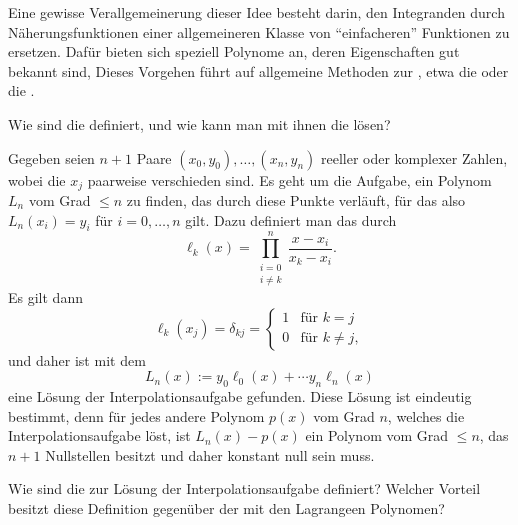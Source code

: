   Eine gewisse Verallgemeinerung 
  dieser Idee besteht darin, den Integranden durch 
  Näherungsfunktionen einer allgemeineren Klasse von 
  "`einfacheren"' Funktionen zu ersetzen. Dafür bieten sich speziell 
  Polynome an, deren Eigenschaften gut bekannt sind, 
  Dieses Vorgehen 
  führt auf allgemeine Methoden zur , 
  etwa die  oder die 
  .  

  \begin{frage}
    Wie sind die  definiert, und wie 
    kann man mit ihnen die   
    lösen?
  \end{frage} 

  \begin{antwort}
    Gegeben seien $n+1$ Paare $(x_0,y_0),\ldots, (x_n,y_n)$ 
    reeller oder komplexer Zahlen, wobei die $x_j$ paarweise verschieden sind. 
    Es geht um die Aufgabe, ein Polynom $L_n$ 
    vom Grad $\le n$ zu finden, das durch diese Punkte verläuft, für das also 
    $L_n(x_i) = y_i$ für $i=0,\ldots, n$ gilt. Dazu definiert man 
    das  durch 
    \[
    \ell_k (x) = \prod_{\substack{i=0 \\ i \not=k }}^n 
    \frac{x-x_i}{x_k - x_i}.
    \]
    Es gilt dann 
    \[
    \ell_k (x_j) = \delta_{kj} = \left\{ \begin{array}{ll} 
        1 & \text{für $k=j$} \\
        0 & \text{für $k\not=j$},
      \end{array} \right. 
    \]
    und daher ist mit dem 
    \[
    L_n (x) := y_0 \ell_0 (x) + \cdots y_n \ell_n (x)
    \]
    eine Lösung der Interpolationsaufgabe gefunden. 
    Diese Lösung ist eindeutig bestimmt, denn für jedes andere Polynom $p(x)$ 
    vom Grad $n$, welches die Interpolationsaufgabe löst, ist $L_n(x)-p(x)$ 
    ein Polynom vom Grad $\le n$, das $n+1$ Nullstellen besitzt und 
    daher konstant null sein muss. \AntEnd
  \end{antwort}

  \begin{frage}
    Wie sind die  zur Lösung der Interpolationsaufgabe 
    definiert? Welcher Vorteil besitzt diese Definition gegenüber der 
    mit den Lagrange\sch en Polynomen?
  \end{frage}

